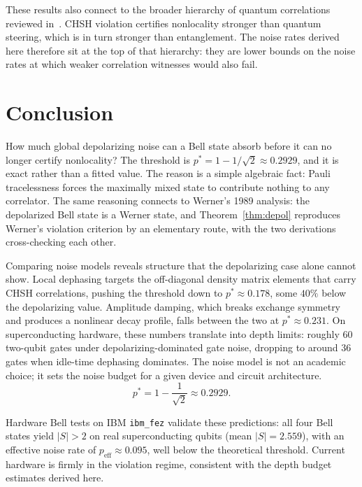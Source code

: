 \documentclass[12pt]{article}
\newcommand{\pstar}{p^*}
\begin{document}
These results also connect to the broader hierarchy of quantum correlations reviewed in~\cite{brunner2014}.
CHSH violation certifies nonlocality stronger than quantum steering, which is in turn stronger
than entanglement. The noise rates derived here therefore sit at the top of that hierarchy:
they are lower bounds on the noise rates at which weaker correlation witnesses would also fail.

\section{Conclusion}
\label{sec:conclusion}

How much global depolarizing noise can a Bell state absorb before it can no longer certify
nonlocality? The threshold is $\pstar = 1 - 1/\sqrt{2} \approx 0.2929$, and it is exact rather
than a fitted value. The reason is a simple algebraic fact: Pauli tracelessness forces the
maximally mixed state to contribute nothing to any correlator.
The same reasoning connects to Werner's 1989 analysis: the depolarized Bell state is a Werner
state, and Theorem~\ref{thm:depol} reproduces Werner's violation criterion by an elementary route,
with the two derivations cross-checking each other.

Comparing noise models reveals structure that the depolarizing case alone cannot show.
Local dephasing targets the off-diagonal density matrix elements that carry CHSH correlations,
pushing the threshold down to $\pstar \approx 0.178$, some $40\%$ below the depolarizing value.
Amplitude damping, which breaks exchange symmetry and produces a nonlinear decay profile,
falls between the two at $\pstar \approx 0.231$.
On superconducting hardware, these numbers translate into depth limits: roughly 60 two-qubit
gates under depolarizing-dominated gate noise, dropping to around 36 gates when idle-time
dephasing dominates.
The noise model is not an academic choice; it sets the noise budget for a given device and
circuit architecture.
\begin{equation}
  \pstar = 1 - \frac{1}{\sqrt{2}} \approx 0.2929.
  \label{eq:pstar_final}
\end{equation}

Hardware Bell tests on IBM \texttt{ibm\_fez} validate these predictions: all four Bell states
yield $|S| > 2$ on real superconducting qubits (mean $|S| = 2.559$), with an effective noise
rate of $p_\text{eff} \approx 0.095$, well below the theoretical threshold.
Current hardware is firmly in the violation regime, consistent with the depth budget estimates derived here.
\end{document}
